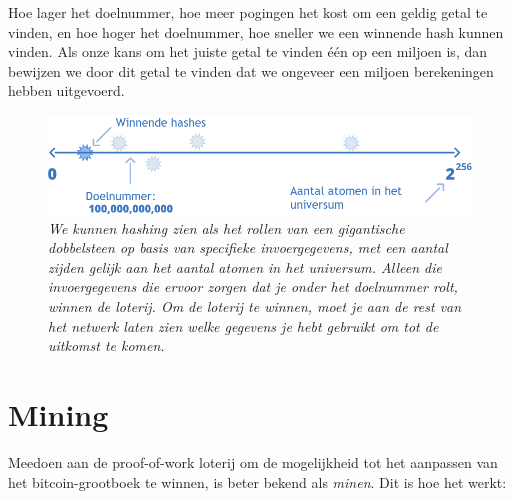 \documentclass[smalldemyvopaper,11pt,twoside,onecolumn,openright,extrafontsizes]{memoir}
\begin{document}
Hoe lager het doelnummer, hoe meer pogingen het kost om een geldig getal te vinden, en hoe hoger het doelnummer, hoe sneller we een winnende hash kunnen vinden. Als onze kans om het juiste getal te vinden één op een miljoen is, dan bewijzen we door dit getal te vinden dat we ongeveer een miljoen berekeningen hebben uitgevoerd.

\begin{figure}
    \centering
    \includegraphics[width=\textwidth]{images/fig5.png}
    \caption{\footnotesize{\textit{We kunnen hashing zien als het rollen van een gigantische dobbelsteen op basis van specifieke invoergegevens, met een aantal zijden gelijk aan het aantal atomen in het universum. Alleen die invoergegevens die ervoor zorgen dat je onder het doelnummer rolt, winnen de loterij. Om de loterij te winnen, moet je aan de rest van het netwerk laten zien welke gegevens je hebt gebruikt om tot de uitkomst te komen.}}}
    \label{fig5}
\end{figure}

\chapter{Mining}

Meedoen aan de proof-of-work loterij om de mogelijkheid tot het aanpassen van het bitcoin-grootboek te winnen, is beter bekend als \textit{minen}. Dit is hoe het werkt:
\end{document}
